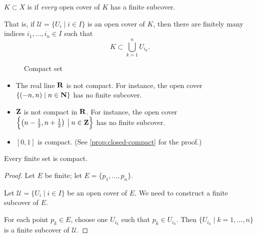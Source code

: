 \begin{definition}[Compactness]
$K\subset X$ is  if \emph{every} open cover of $K$ has a finite subcover.
\end{definition}

That is, if $\mathcal{U}=\{U_i\mid i\in I\}$ is an open cover of $K$, then there are finitely many indices $i_1,\dots,i_n\in I$ such that
\[K\subset\bigcup_{k=1}^{n}U_{i_k}.\]

\begin{figure}[H]
\centering
{}
\caption{Compact set}
\end{figure}

\begin{example}
\begin{itemize}
\item The real line $\mathbf R$ is not compact. For instance, the open cover $\{(-n,n)\mid n\in\mathbf N\}$ has no finite subcover.
\item $\mathbf Z$ is not compact in $\mathbf R$. For instance, the open cover $\left\{\left(n-\frac{1}{2},n+\frac{1}{2}\right)\:\big|\:n\in\mathbf Z\right\}$ has no finite subcover.
\item $[0,1]$ is compact. (See \cref{prop:closed-compact} for the proof.)
\end{itemize}
\end{example}

\begin{proposition}
Every finite set is compact.
\end{proposition}

\begin{proof}
Let $E$ be finite; let $E=\{p_1,\dots,p_n\}$.

Let $\mathcal{U}=\{U_i\mid i\in I\}$ be an open cover of $E$. We need to construct a finite subcover of $E$.

For each point $p_k\in E$, choose one $U_{i_k}$ such that $p_k\in U_{i_k}$. Then $\{U_{i_k}\mid k=1,\dots,n\}$ is a finite subcover of $\mathcal{U}$.
\end{proof}

